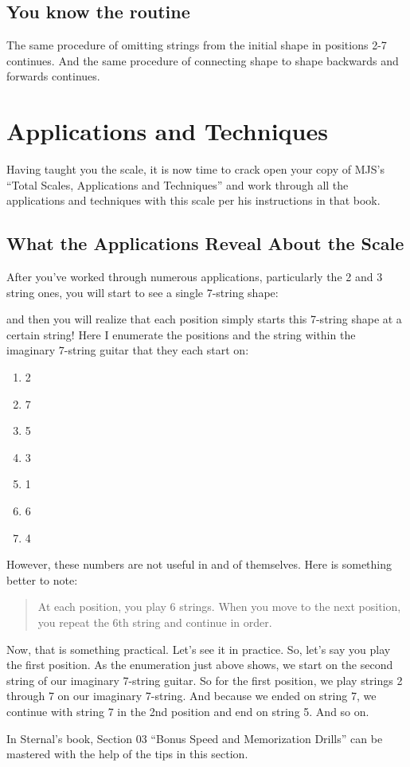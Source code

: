 \documentclass[12pt]{report}
\begin{document}
\subsection {You know the routine}

The same procedure of omitting strings from the initial shape in
positions 2-7 continues. And the same procedure of connecting shape to
shape backwards and forwards continues.

\section{Applications and Techniques}

Having taught you the scale, it is now time to crack open your copy of
MJS's ``Total Scales, Applications and Techniques'' and work through
all the applications and techniques with this scale per his
instructions in that book.

\subsection{What the Applications Reveal About the Scale} 

After you've worked through numerous applications, particularly the 2
and 3 string ones, you will start to see a single 7-string shape:


\def\numfrets{9}


and then you will realize that each position simply starts this
7-string shape at a certain string! Here I enumerate the positions and
the string within the imaginary 7-string guitar that they each start on:

\begin{enumerate}
\item 2
\item 7
\item 5
\item 3
\item 1
\item 6
\item 4
\end{enumerate}


However, these numbers are not useful in and of themselves. Here is
something better to note:

\begin{quote}
At each position, you play 6 strings. When you move to the next
position, you repeat the 6th string and continue in order.
\end{quote}

Now, that is something practical. Let's see it in practice. So, let's
say you play the first position. As the enumeration just above shows,
we start on the second string of our imaginary 7-string guitar. So for
the first position, we play strings 2 through 7 on our imaginary
7-string. And because we ended on string 7, we continue with string 7
in the 2nd position and end on string 5. And so on.

In Sternal's book, Section 03 ``Bonus Speed and Memorization Drills''
can be mastered with the help of the tips in this section.
\end{document}
